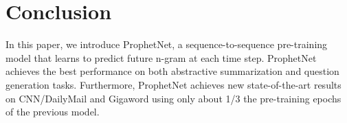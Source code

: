 \documentclass[11pt,a4paper]{article}
\begin{document}
\section{Conclusion}
In this paper, we introduce ProphetNet, a sequence-to-sequence pre-training model that learns to predict future n-gram at each time step.
ProphetNet achieves the best performance on both abstractive summarization and question generation tasks. Furthermore, ProphetNet achieves new state-of-the-art results on CNN/DailyMail and Gigaword using only about 1/3 the pre-training epochs of the previous model. 





\newpage



\end{document}
